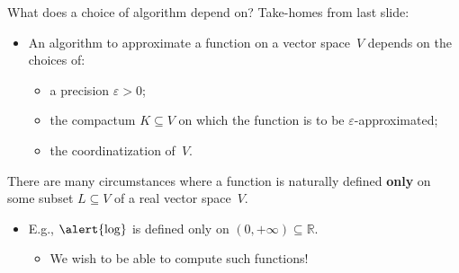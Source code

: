\documentclass{beamer}
\begin{document}
\begin{frame}{What does a choice of algorithm depend on?}
\alert{Take-homes} from last slide:
\begin{itemize}
\item An \alert{algorithm} to approximate a function on a vector space~$V$ depends on the choices of:
  \begin{itemize}
  \item a \alert{precision $\varepsilon>0$};
  \item the \alert{compactum $K\subseteq V$} on which the function is to be $\varepsilon$-approximated;
  \item the \alert{coordinatization of~$V$}.
  \end{itemize}
\end{itemize}
 There are many circumstances where a function is naturally defined \textbf{only} on some \alert{subset $L\subseteq V$} of a real vector space~$V$.
 \begin{itemize}
 \item E.g., $\alert{\log}$ is defined only on \alert{$(0,+\infty)\subseteq\mathbb{R}$}.
   \begin{itemize}
   \item We wish to be able to compute such functions!
   \end{itemize}
 \end{itemize}
\end{frame}
\end{document}
